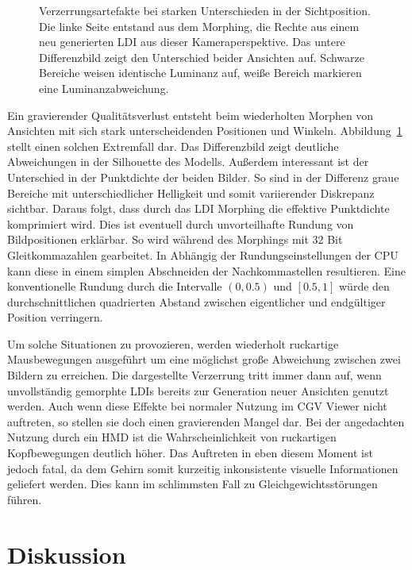 \documentclass[hyperref, beleg, german, final, twoside]{cgvpub}
\begin{document}
\begin{figure}
	\caption{Verzerrungsartefakte bei starken Unterschieden in der Sichtposition.
	Die linke Seite entstand aus dem Morphing, die Rechte aus einem neu 
	generierten LDI aus dieser Kameraperspektive. Das untere Differenzbild zeigt
	den Unterschied beider Ansichten auf. Schwarze Bereiche weisen identische 
	Luminanz auf, weiße Bereich markieren eine Luminanzabweichung.}%
	\label{img:distortion}
\end{figure}

Ein gravierender Qualitätsverlust entsteht beim wiederholten Morphen von
Ansichten mit sich stark unterscheidenden Positionen und Winkeln.
Abbildung~\ref{img:distortion} stellt einen solchen Extremfall dar. Das
Differenzbild zeigt deutliche Abweichungen in der Silhouette des Modells.
Außerdem interessant ist der Unterschied in der Punktdichte der beiden Bilder.
So sind in der Differenz graue Bereiche mit unterschiedlicher Helligkeit und
somit variierender Diskrepanz sichtbar. Daraus folgt, dass durch das LDI
Morphing die effektive Punktdichte komprimiert wird. Dies ist eventuell durch
unvorteilhafte Rundung von Bildpositionen erklärbar. So wird während des
Morphings mit 32 Bit Gleitkommazahlen gearbeitet. In Abhängig der
Rundungseinstellungen der CPU kann diese in einem simplen Abschneiden der
Nachkommastellen resultieren. Eine konventionelle Rundung durch die Intervalle
\( \left(0, 0.5\right) \) und \( \left[0.5, 1\right] \) würde den
durchschnittlichen quadrierten Abstand zwischen eigentlicher und endgültiger
Position verringern.

Um solche Situationen zu provozieren, werden wiederholt
ruckartige Mausbewegungen ausgeführt um eine möglichst große Abweichung
zwischen zwei Bildern zu erreichen. Die dargestellte Verzerrung tritt immer
dann auf, wenn unvollständig gemorphte LDIs bereits zur Generation neuer
Ansichten genutzt werden. Auch wenn diese Effekte bei normaler Nutzung im CGV
Viewer nicht auftreten, so stellen sie doch einen gravierenden Mangel dar. Bei
der angedachten Nutzung durch ein HMD ist die Wahrscheinlichkeit von
ruckartigen Kopfbewegungen deutlich höher. Das Auftreten in eben diesem Moment
ist jedoch fatal, da dem Gehirn somit kurzeitig inkonsistente visuelle
Informationen geliefert werden. Dies kann im schlimmsten Fall zu
Gleichgewichtsstörungen führen.

\section{Diskussion}%
\label{sec:discussion}
\end{document}

